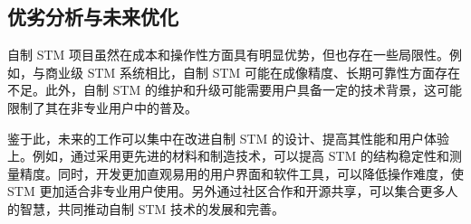 \documentclass{article}
\begin{document}
\subsection{优劣分析与未来优化}
自制 STM 项目虽然在成本和操作性方面具有明显优势，但也存在一些局限性。例如，与商业级 STM 系统相比，自制 STM 可能在成像精度、长期可靠性方面存在不足。此外，自制 STM 的维护和升级可能需要用户具备一定的技术背景，这可能限制了其在非专业用户中的普及。

鉴于此，未来的工作可以集中在改进自制 STM 的设计、提高其性能和用户体验上。例如，通过采用更先进的材料和制造技术，可以提高 STM 的结构稳定性和测量精度。同时，开发更加直观易用的用户界面和软件工具，可以降低操作难度，使 STM 更加适合非专业用户使用。另外通过社区合作和开源共享，可以集合更多人的智慧，共同推动自制 STM 技术的发展和完善。


\clearpage
{}
\end{document}
